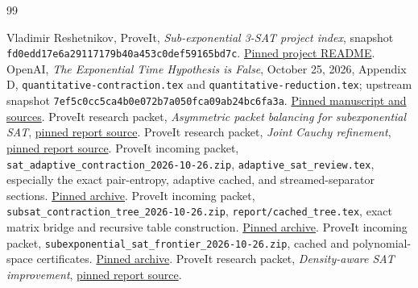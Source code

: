 \documentclass[11pt,letterpaper]{article}
\theoremstyle{remark}\newtheorem{remark}[theorem]{Remark}
\begin{document}
\begin{thebibliography}{99}\small\raggedright
{} Vladimir Reshetnikov, ProveIt, \emph{Sub-exponential 3-SAT project index},
snapshot \texttt{fd0edd17e6a29117179b40a453c0def59165bd7c}.
\href{https://github.com/VladimirReshetnikov/ProveIt/blob/fd0edd17e6a29117179b40a453c0def59165bd7c/Computability/SubexponentialSAT/README.md}{Pinned project README}.
 OpenAI, \emph{The Exponential Time Hypothesis is False}, October 25, 2026,
Appendix D, \texttt{quantitative-contraction.tex} and \texttt{quantitative-reduction.tex};
upstream snapshot \texttt{7ef5c0cc5ca4b0e072b7a050fca09ab24bc6fa3a}.
\href{https://github.com/openai/math/tree/7ef5c0cc5ca4b0e072b7a050fca09ab24bc6fa3a/preprints/The-Exponential-Time-Hypothesis-is-False-October-25-2026}{Pinned manuscript and sources}.
 ProveIt research packet, \emph{Asymmetric packet balancing for subexponential SAT},
\href{https://github.com/VladimirReshetnikov/ProveIt/blob/fd0edd17e6a29117179b40a453c0def59165bd7c/Computability/SubexponentialSAT/Research/eth_asymmetric_packet_balancing/report.tex}{pinned report source}.
 ProveIt research packet, \emph{Joint Cauchy refinement},
\href{https://github.com/VladimirReshetnikov/ProveIt/blob/fd0edd17e6a29117179b40a453c0def59165bd7c/Computability/SubexponentialSAT/Research/eth_joint_cauchy/report.tex}{pinned report source}.
 ProveIt incoming packet,
\texttt{sat\_adaptive\_contraction\_2026-10-26.zip},
\texttt{adaptive\_sat\_review.tex}, especially the exact pair-entropy,
adaptive cached, and streamed-separator sections.
\href{https://github.com/VladimirReshetnikov/ProveIt/blob/fd0edd17e6a29117179b40a453c0def59165bd7c/docs/incoming/sat_adaptive_contraction_2026-10-26.zip}{Pinned archive}.
 ProveIt incoming packet,
\texttt{subsat\_contraction\_tree\_2026-10-26.zip},
\texttt{report/cached\_tree.tex}, exact matrix bridge and recursive table construction.
\href{https://github.com/VladimirReshetnikov/ProveIt/blob/fd0edd17e6a29117179b40a453c0def59165bd7c/docs/incoming/subsat_contraction_tree_2026-10-26.zip}{Pinned archive}.
 ProveIt incoming packet,
\texttt{subexponential\_sat\_frontier\_2026-10-26.zip}, cached and polynomial-space certificates.
\href{https://github.com/VladimirReshetnikov/ProveIt/blob/fd0edd17e6a29117179b40a453c0def59165bd7c/docs/incoming/subexponential_sat_frontier_2026-10-26.zip}{Pinned archive}.
 ProveIt research packet, \emph{Density-aware SAT improvement},
\href{https://github.com/VladimirReshetnikov/ProveIt/blob/fd0edd17e6a29117179b40a453c0def59165bd7c/Computability/SubexponentialSAT/Research/sat_density_improvement/density_aware_sat_improvement.tex}{pinned report source}.

\end{thebibliography}
\end{document}
